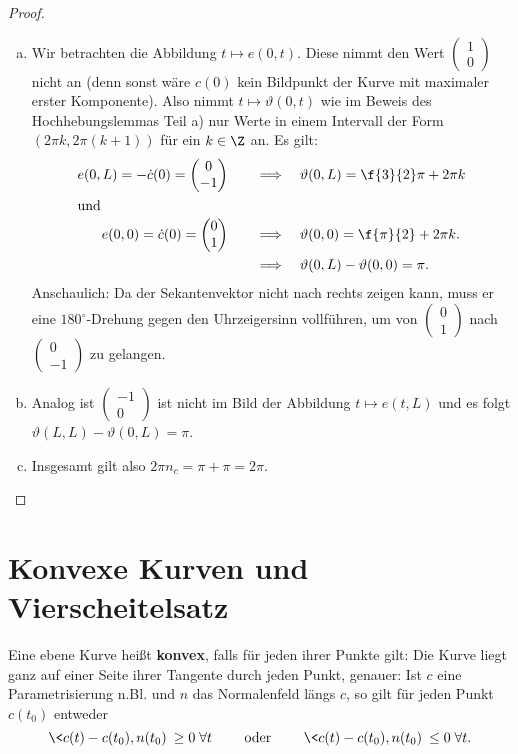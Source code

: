 \documentclass{mycourse}
\newcommand{\tta}{\vartheta}
\begin{document}
\begin{st}[Umlaufsatz]
\begin{proof}
\begin{enumerate}[a)]
	\item
		Wir betrachten die Abbildung $t \mapsto e(0, t)$. Diese nimmt den Wert $\begin{pmatrix} 1 \\ 0 \end{pmatrix}$ nicht an (denn sonst wäre $c(0)$ kein Bildpunkt der Kurve mit maximaler erster Komponente). Also nimmt $t \mapsto \tta(0, t)$ wie im Beweis des Hochhebungslemmas Teil a) nur Werte in einem Intervall der Form $(2 \pi k, 2 \pi (k+1))$ für ein $k \in \Z$ an. Es gilt:
\begin{align*}
 e(0, L) = - \dot c(0) = \begin{pmatrix} 0 \\ -1 \end{pmatrix} \qquad &\Longrightarrow \quad \tta(0, L) = \f{3}{2} \pi + 2 \pi k \\
\intertext{und} e(0, 0) = \dot c(0) = \begin{pmatrix} 0 \\ 1 \end{pmatrix} \qquad &\Longrightarrow \quad \tta(0, 0) = \f{\pi}{2} + 2 \pi k. \\
& \Longrightarrow \quad \tta(0, L) - \tta(0, 0) = \pi.
\end{align*}
Anschaulich: Da der Sekantenvektor nicht nach rechts zeigen kann, muss er eine $180^{\circ}$-Drehung gegen den Uhrzeigersinn vollführen, um von $\begin{pmatrix} 0 \\ 1 \end{pmatrix}$ nach $\begin{pmatrix} 0 \\ -1 \end{pmatrix}$ zu gelangen.

	\item
		Analog ist  $\begin{pmatrix} -1 \\ 0 \end{pmatrix}$ ist nicht im Bild der Abbildung $t \mapsto e(t, L)$ und es folgt $\tta(L, L) - \tta(0, L) = \pi$.

	\item
		Insgesamt gilt also $2 \pi n_c = \pi + \pi = 2 \pi$.
\end{enumerate}
\end{proof}
\end{st}

\section{Konvexe Kurven und Vierscheitelsatz}
\begin{df}
Eine ebene Kurve heißt \textbf{konvex}, falls für jeden ihrer Punkte gilt: Die Kurve liegt ganz auf einer Seite ihrer Tangente durch jeden Punkt, genauer: Ist $c$ eine Parametrisierung n.Bl. und $n$ das Normalenfeld längs $c$, so gilt für jeden Punkt $c(t_0)$ entweder
\[ \< c(t) - c(t_0), n(t_0) \> \geq 0 \; \forall t \qquad \text{ oder } \qquad \< c(t) - c(t_0), n(t_0) \> \leq 0 \; \forall t. \]
\end{df}
\end{document}
